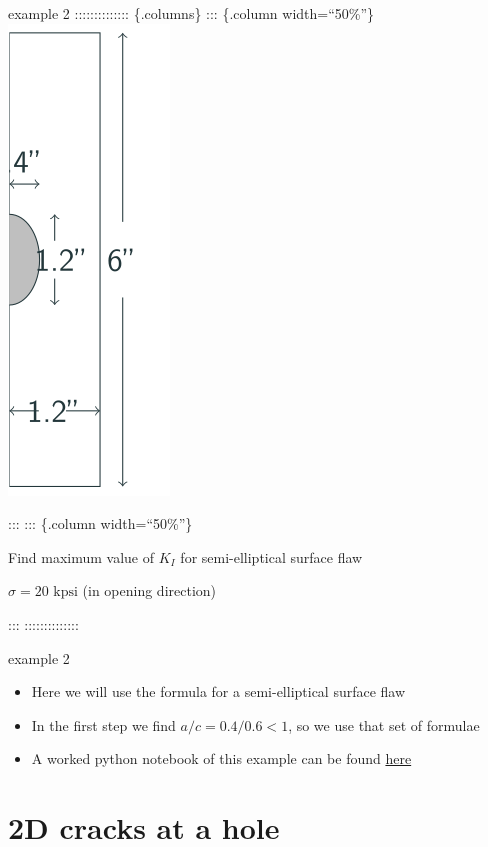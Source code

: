 \documentclass[
  letterpaper,
  ignorenonframetext,
  aspectratio=43,
  handout,
  12pt]{beamer}
\providecommand{\tightlist}{%
  \setlength{\itemsep}{0pt}\setlength{\parskip}{0pt}}
\providecommand{\tightlist}{%
\setlength{\itemsep}{0pt}\setlength{\parskip}{0pt}}
\let\Oldincludegraphics\includegraphics
\renewcommand{\includegraphics}[2][]{\Oldincludegraphics[width=\textwidth,height=0.7\textheight,keepaspectratio]{#2}}
\begin{document}
\begin{frame}{example 2}
\protect\hypertarget{example-2}{}
:::::::::::::: \{.columns\} ::: \{.column width=``50\%''\}
\includegraphics{../images/example-1.svg}

::: ::: \{.column width=``50\%''\}

Find maximum value of \(K_I\) for semi-elliptical surface flaw

\(\sigma = 20 \text{ kpsi}\) (in opening direction)

::: ::::::::::::::
\end{frame}

\begin{frame}{example 2}
\protect\hypertarget{example-2-1}{}
\begin{itemize}
\tightlist
\item
  Here we will use the formula for a semi-elliptical surface flaw
\item
  In the first step we find \(a/c = 0.4/0.6 < 1\), so we use that set of
  formulae
\item
  A worked python notebook of this example can be found
  \href{../examples/Finite\%20Width.html}{here}
\end{itemize}
\end{frame}

\hypertarget{d-cracks-at-a-hole}{%
\section{2D cracks at a hole}\label{d-cracks-at-a-hole}}
\end{document}
